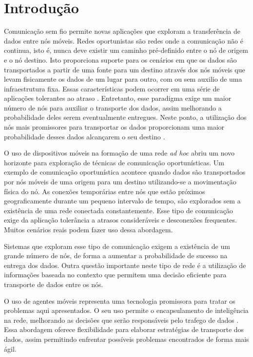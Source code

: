 \section{Introdução}

Comunicação sem fio permite novas aplicações que exploram a transferência de dados entre nós móveis. Redes oportunistas são redes onde a comunicação não é continua, isto é, nunca deve existir um caminho pré-definido entre o nó de origem e o nó destino. Isto proporciona suporte para os cenários em que os dados são transportados a partir de uma fonte para um destino através dos nós móveis que levam fisicamente os dados de um lugar para outro, com ou sem auxilio de uma infraestrutura fixa. Essas características podem ocorrer em uma série de aplicações tolerantes ao atraso \cite{Fall:2003}. Entretanto, esse paradigma exige um maior número de nós para auxiliar o transporte dos dados, assim melhorando a probabilidade deles serem eventualmente entregues. Neste ponto, a utilização dos nós mais promissores para transportar os dados proporcionam uma maior probabilidade desses dados alcançarem o seu destino \cite{Freitas:2013}.

O uso de dispositivos móveis na formação de uma rede \emph{ad hoc} abriu um novo horizonte para exploração de técnicas de comunicação oportunísticas. Um exemplo de comunicação oportunística acontece quando dados são transportados por nós móveis de uma origem para um destino utilizando-se a movimentação física do nó. As conexões temporárias entre nós que estão próximos geograficamente durante um pequeno intervalo de tempo, são explorados sem a existência de uma rede conectada constantemente. Esse tipo de comunicação exige da aplicação tolerância a atrasos consideráveis e desconexões frequentes. Muitos cenários reais podem fazer uso dessa abordagem.

Sistemas que exploram esse tipo de comunicação exigem a existência de um grande número de nós, de forma a aumentar a probabilidade de sucesso na entrega dos dados. Outra questão importante neste tipo de rede é a utilização de informações baseada no contexto que permitem uma decisão eficiente para transporte de dados entre os nós. 

O uso de agentes móveis representa uma tecnologia promissora \cite{Urra:2010} para tratar os problemas aqui apresentados. O seu uso permite o encapsulamento de inteligência na rede, melhorando as decisões que serão responsáveis pelo trafego de dados \cite{Freitas:2010}. Essa abordagem oferece flexibilidade para elaborar estratégias de transporte dos dados, assim permitindo enfrentar possíveis problemas encontrados de forma mais ágil. 

